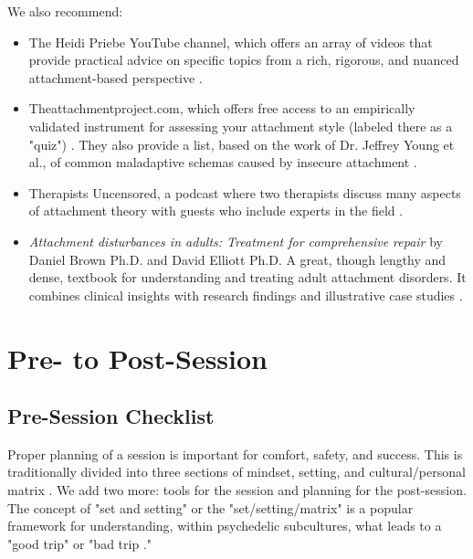 \documentclass[12pt,letterpaper]{book}
\begin{document}
We also recommend:
\begin{itemize}
    \item The Heidi Priebe YouTube channel, which offers an array of videos that provide practical advice on specific topics from a rich, rigorous, and nuanced attachment-based perspective \cite{priebeYoutube}.
    \item Theattachmentproject.com, which offers free access to an empirically validated instrument for assessing your attachment style (labeled there as a "quiz") \cite{attachmentProject}. They also provide a list, based on the work of Dr. Jeffrey Young et al., of common maladaptive schemas caused by insecure attachment \cite{earlyMalSchemas}.
    \item Therapists Uncensored, a podcast where two therapists discuss many aspects of attachment theory with guests who include experts in the field \cite{therapistsUncensored}.
    \item \textit{Attachment disturbances in adults: Treatment for comprehensive repair} by Daniel Brown Ph.D. and David Elliott Ph.D. A great, though lengthy and dense, textbook for understanding and treating adult attachment disorders. It combines clinical insights with research findings and illustrative case studies \cite{brownAttachmentDisturbances}.
\end{itemize}
\chapter{Pre- to Post-Session}
\section{Pre-Session Checklist}
\label{prep}
Proper planning of a session is important for comfort, safety, and success. This is traditionally divided into three sections of mindset, setting, and cultural/personal matrix \cite{setSettingMatrix}. We add two more: tools for the session and planning for the post-session. The concept of "set and setting" or the "set/setting/matrix" is a popular framework for understanding, within psychedelic subcultures, what leads to a "good trip" or "bad trip \cite{setSettingMatrix}."
\end{document}

